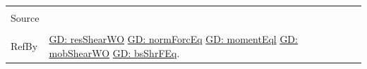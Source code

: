 \documentclass[12pt]{article}
\begin{document}
\begin{minipage}{\textwidth}
\begin{tabular}{p{} p{}}
                                                          \\ \midrule \\
                                                          Source & \cite{fredlund1977}
                                                                   \\ \midrule \\
                                                                   RefBy & \hyperref[GD:resShearWO]{GD: resShearWO} \hyperref[GD:normForcEq]{GD: normForcEq} \hyperref[GD:momentEql]{GD: momentEql} \hyperref[GD:mobShearWO]{GD: mobShearWO} \hyperref[GD:bsShrFEq]{GD: bsShrFEq}.
\\ \bottomrule \end{tabular}
\end{minipage}
\par~
\end{document}
